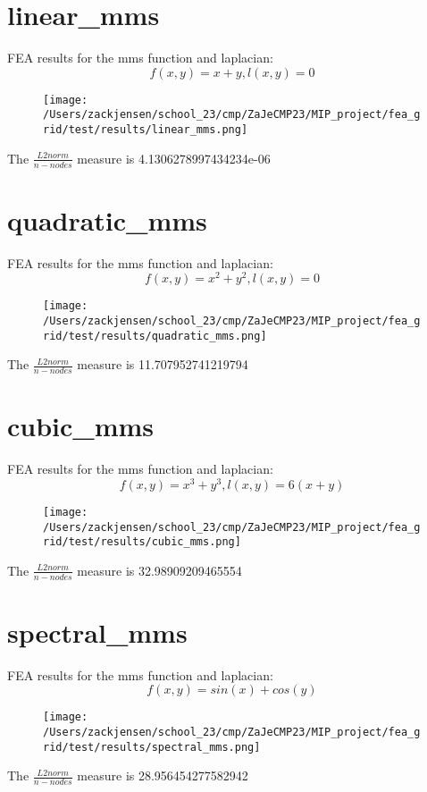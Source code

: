 \documentclass{article}%
\begin{document}
%
\normalsize%
\section{linear\_mms}%
\label{sec:linearmms}%
FEA results for the mms function and laplacian:%
\[%
f(x, y) = x + y, l(x, y) = 0%
\]%


\begin{figure}[h!]%
\centering%
\texttt{[image: /Users/zackjensen/school\_23/cmp/ZaJeCMP23/MIP\_project/fea\_grid/test/results/linear\_mms.png]}%
\end{figure}

%
The $\frac{L2 norm}{n-nodes}$ measure is 4.1306278997434234e-06

%
\newpage%
\section{quadratic\_mms}%
\label{sec:quadraticmms}%
FEA results for the mms function and laplacian:%
\[%
f(x, y) = x^2 + y^2, l(x, y) = 0%
\]%


\begin{figure}[h!]%
\centering%
\texttt{[image: /Users/zackjensen/school\_23/cmp/ZaJeCMP23/MIP\_project/fea\_grid/test/results/quadratic\_mms.png]}%
\end{figure}

%
The $\frac{L2 norm}{n-nodes}$ measure is 11.707952741219794

%
\newpage%
\section{cubic\_mms}%
\label{sec:cubicmms}%
FEA results for the mms function and laplacian:%
\[%
f(x, y) = x^3 + y^3, l(x, y) = 6(x + y)%
\]%


\begin{figure}[h!]%
\centering%
\texttt{[image: /Users/zackjensen/school\_23/cmp/ZaJeCMP23/MIP\_project/fea\_grid/test/results/cubic\_mms.png]}%
\end{figure}

%
The $\frac{L2 norm}{n-nodes}$ measure is 32.98909209465554

%
\newpage%
\section{spectral\_mms}%
\label{sec:spectralmms}%
FEA results for the mms function and laplacian:%
\[%
f(x, y) = sin(x) + cos(y)%
\]%


\begin{figure}[h!]%
\centering%
\texttt{[image: /Users/zackjensen/school\_23/cmp/ZaJeCMP23/MIP\_project/fea\_grid/test/results/spectral\_mms.png]}%
\end{figure}

%
The $\frac{L2 norm}{n-nodes}$ measure is 28.956454277582942

%
\newpage%
\end{document}
